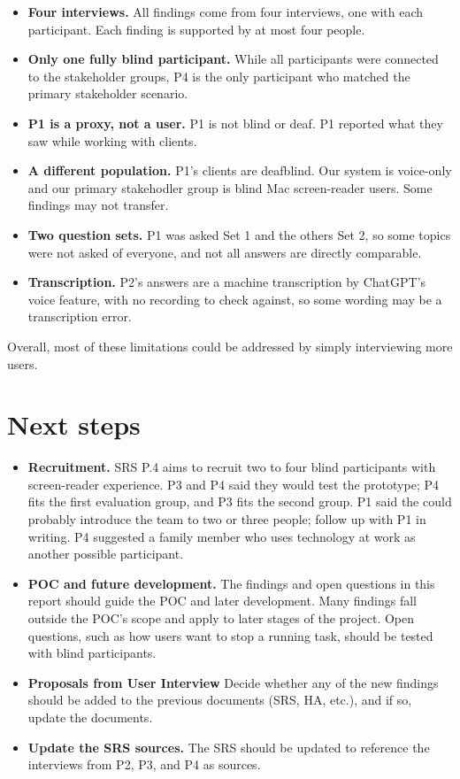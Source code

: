 \documentclass[12pt, titlepage]{article}
\begin{document}
\begin{itemize}
    \item \textbf{Four interviews.} All findings come from four interviews, one with each participant. Each finding is supported by at most four people.
    \item \textbf{Only one fully blind participant.} While all participants were connected to the stakeholder groups, P4 is the only participant who matched the primary stakeholder scenario.
    \item \textbf{P1 is a proxy, not a user.} P1 is not blind or deaf. P1 reported what they saw while working with clients.
    \item \textbf{A different population.} P1's clients are deafblind. Our system is voice-only and our primary stakehodler group is blind Mac screen-reader users. Some findings may not transfer.
    \item \textbf{Two question sets.} P1 was asked Set 1 and the others Set 2, so some topics were not asked of everyone, and not all answers are directly comparable.
    \item \textbf{Transcription.} P2's answers are a machine transcription by ChatGPT's voice feature, with no recording to check against, so some wording may be a transcription error.
\end{itemize}
Overall, most of these limitations could be addressed by simply interviewing more users.

\section{Next steps}\label{sec:next}

\begin{itemize}
    \item \textbf{Recruitment.} SRS P.4 aims to recruit two to four blind participants with screen-reader experience. P3 and P4 said they would test the prototype; P4 fits the first evaluation group, and P3 fits the second group. P1 said the could probably introduce the team to two or three people; follow up with P1 in writing. P4 suggested a family member who uses technology at work as another possible participant. 
    \item \textbf{POC and future development.} The findings and open questions in this report should guide the POC and later development. Many findings fall outside the POC's scope and apply to later stages of the project. Open questions, such as how users want to stop a running task, should be tested with blind participants.
    \item \textbf{Proposals from User Interview} Decide whether any of the new findings should be added to the previous documents (SRS, HA, etc.), and if so, update the documents.
    \item \textbf{Update the SRS sources.} The SRS should be updated to reference the interviews from P2, P3, and P4 as sources.
\end{itemize}
\end{document}
